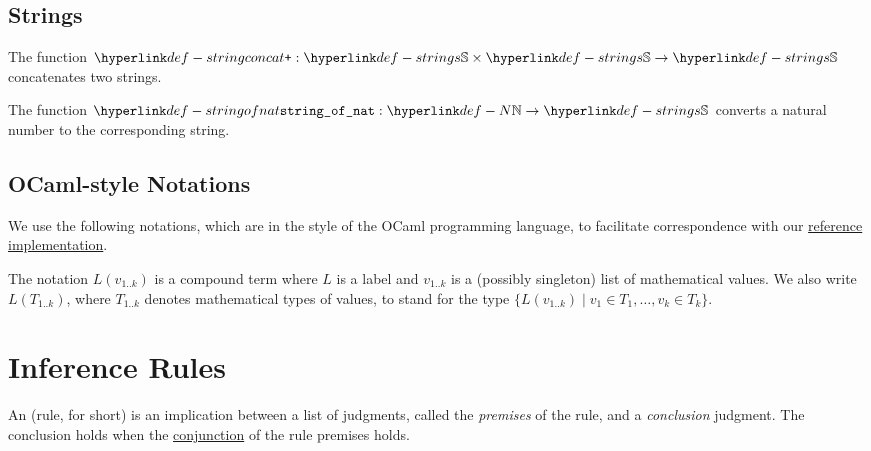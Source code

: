 \subsection{Strings}
\hypertarget{def-stringconcat}{}
The function $\stringconcat : \Strings \times \Strings \rightarrow \Strings$
concatenates two strings.

\hypertarget{def-stringofnat}{}
The function $\stringofnat : \N \rightarrow \Strings$ converts a natural number
to the corresponding string.

\subsection{OCaml-style Notations}
We use the following notations, which are in the style of the OCaml programming language,
to facilitate correspondence with our
\href{https://github.com/herd/herdtools7/tree/master/asllib}{reference implementation}.

The notation $L(v_{1..k})$ is a compound term where $L$ is a label and $v_{1..k}$ is a (possibly singleton) list of mathematical values.
We also write $L(T_{1..k})$, where $T_{1..k}$ denotes mathematical types of values, to stand for the type
$\{ L(v_{1..k}) \;|\; v_1\in T_1,\ldots,v_k\in T_k \}$.

\hypertarget{def-optional}{}

\section{Inference Rules\label{sec:Inference Rules}}
\hypertarget{def-inferencerule}{}
An \emph{\inferencerule} (rule, for short) is an implication between a list of judgments,
called the \emph{premises} of the rule,
and a \emph{conclusion} judgment.
The conclusion holds when the \underline{conjunction} of the rule premises holds.

